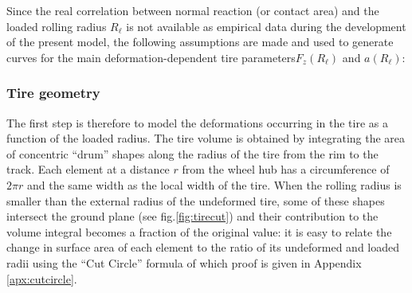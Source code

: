 \documentclass[12pt,a4paper]{report}
\newcommand{\virgolette}[1]{
\textquotedblleft #1\textquotedblright
}
\newcommand{\mm}{\scriptsize{[mm]}}
\newcommand{\Pa}{\scriptsize{[Pa]}}
\newcommand{\figura}[5][htbp]{
\begin{figure}[#1]
\begin{center}
\texttt{[image: \#2]}
\caption{#4}\label{#5}
\end{center}
\end{figure}
}
\newcommand{\tabella}[5][htbp]{
\begin{table}[#1]
	\begin{center}
		\texttt{
		\begin{tabular}{#2}
		#5		
		\end{tabular} } \label{#3}\\ \vspace{3mm}
		\footnotesize{Table \ref{#3}: #4}
	\end{center}
\end{table}
}
\begin{document}
Since the real correlation between normal reaction (or contact area) and the loaded rolling radius $R_\ell$ is not available as empirical data during the development of the present model, the following assumptions are made and used to generate curves for the main deformation-dependent tire parameters$F_z(R_\ell)$ and $a(R_\ell)$:
\subsubsection*{Tire geometry}
The first step is therefore to model the deformations occurring in the tire as a function of the loaded radius.
The tire volume is obtained by integrating the area of concentric \virgolette{drum} shapes along the radius of the tire from the rim to the track. Each element at a distance $r$ from the wheel hub has a circumference of $2\pi r$ and the same width as the local width of the tire. When the rolling radius is smaller than the external radius of the undeformed tire, some of these shapes intersect the ground plane (see fig.\ref{fig:tirecut}) and their contribution to the volume integral becomes a fraction of the original value: it is easy to relate the change in surface area of each element to the ratio of its undeformed and loaded radii using the \virgolette{Cut Circle} formula of which proof is given in Appendix \ref{apx:cutcircle}. 
\end{document}
